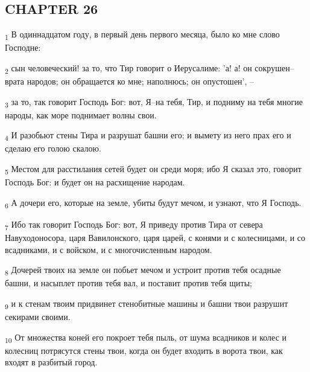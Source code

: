 \subsection{CHAPTER 26}
\begin{tcolorbox}
\textsubscript{1} В одиннадцатом году, в первый день первого месяца, было ко мне слово Господне:
\end{tcolorbox}
\begin{tcolorbox}
\textsubscript{2} сын человеческий! за то, что Тир говорит о Иерусалиме: 'а! а! он сокрушен--врата народов; он обращается ко мне; наполнюсь; он опустошен', --
\end{tcolorbox}
\begin{tcolorbox}
\textsubscript{3} за то, так говорит Господь Бог: вот, Я--на тебя, Тир, и подниму на тебя многие народы, как море поднимает волны свои.
\end{tcolorbox}
\begin{tcolorbox}
\textsubscript{4} И разобьют стены Тира и разрушат башни его; и вымету из него прах его и сделаю его голою скалою.
\end{tcolorbox}
\begin{tcolorbox}
\textsubscript{5} Местом для расстилания сетей будет он среди моря; ибо Я сказал это, говорит Господь Бог: и будет он на расхищение народам.
\end{tcolorbox}
\begin{tcolorbox}
\textsubscript{6} А дочери его, которые на земле, убиты будут мечом, и узнают, что Я Господь.
\end{tcolorbox}
\begin{tcolorbox}
\textsubscript{7} Ибо так говорит Господь Бог: вот, Я приведу против Тира от севера Навуходоносора, царя Вавилонского, царя царей, с конями и с колесницами, и со всадниками, и с войском, и с многочисленным народом.
\end{tcolorbox}
\begin{tcolorbox}
\textsubscript{8} Дочерей твоих на земле он побьет мечом и устроит против тебя осадные башни, и насыплет против тебя вал, и поставит против тебя щиты;
\end{tcolorbox}
\begin{tcolorbox}
\textsubscript{9} и к стенам твоим придвинет стенобитные машины и башни твои разрушит секирами своими.
\end{tcolorbox}
\begin{tcolorbox}
\textsubscript{10} От множества коней его покроет тебя пыль, от шума всадников и колес и колесниц потрясутся стены твои, когда он будет входить в ворота твои, как входят в разбитый город.
\end{tcolorbox}
